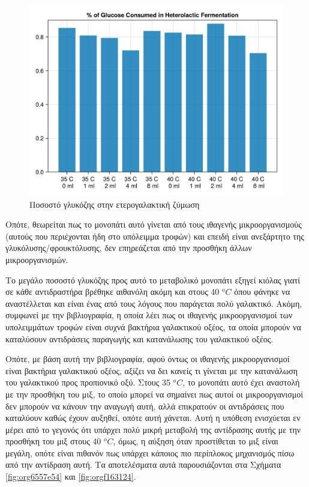 \documentclass[11pt]{report}
\begin{document}
\begin{figure}[htbp]
\centering
\includegraphics[width=.9\linewidth]{../plots/metabolic_results/heterolactate_flux.png}
\caption{\label{fig:org68ca7ef}Ποσοστό γλυκόζης στην ετερογαλακτική ζύμωση}
\end{figure}

Οπότε, θεωρείται πως το μονοπάτι αυτό γίνεται από τους ιθαγενής μικροοργανισμούς (αυτούς που περιέχονται ήδη στο υπόλειμμα τροφών) και επειδή είναι ανεξάρτητο της γλυκόλυσης/φρουκτόλυσης, δεν επηρεάζεται από την προσθήκη άλλων μικροοργανισμών.

Το μεγάλο ποσοστό γλυκόζης προς αυτό το μεταβολικό μονοπάτι εξηγεί κιόλας γιατί σε κάθε αντιδραστήρα βρέθηκε αιθανόλη ακόμη και στους 40 \(^oC\) όπου φάνηκε να αναστέλλεται και είναι ένας από τους λόγους που παράγεται πολύ γαλακτικό. Ακόμη, συμφωνεί με την βιβλιογραφία, η οποία λέει πως οι ιθαγενής μικροοργανισμοί των υπολειμμάτων τροφών είναι συχνά βακτήρια γαλακτικού οξέος, τα οποία μπορούν να καταλύσουν αντιδράσεις παραγωγής και κατανάλωσης του γαλακτικού οξέος.

Οπότε, με βάση αυτή την βιβλιογραφία, αφού όντως οι ιθαγενής μικροοργανισμοί είναι βακτήρια γαλακτικού οξέος, αξίζει να δει κανείς τι γίνεται με την κατανάλωση του γαλακτικού προς προπιονικό οξύ. Στους 35 \(^oC\), το μονοπάτι αυτό έχει αναστολή με την προσθήκη του μιξ, το οποίο μπορεί να σημαίνει πως αυτοί οι μικροοργανισμοί δεν μπορούν να κάνουν την αναγωγή αυτή, αλλά επικρατούν οι αντιδράσεις που καταλύουν καθώς έχουν αυξηθεί, οπότε αυτή χάνεται. Αυτή η υπόθεση ενισχύεται εν μέρει από το γεγονός ότι υπάρχει πολύ μικρή μεταβολή της αντίδρασης αυτής με την προσθήκη του μιξ στους 40 \(^oC\), όμως, η αύξηση όταν προστίθεται το μιξ είναι μεγάλη, οπότε είναι πιθανόν πως υπάρχει κάποιος πιο περίπλοκος μηχανισμός πίσω από την αντίδραση αυτή. Τα αποτελέσματα αυτά παρουσιάζονται στα Σχήματα \ref{fig:org6557e54} και \ref{fig:orgf163124}. 
\end{document}
